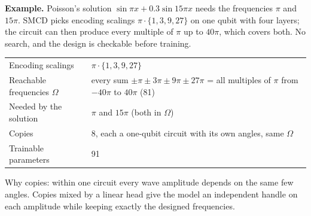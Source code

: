 \documentclass[11pt,a4paper]{article}
\newcommand{\newpart}{\clearpage}
\begin{document}
\textbf{Example.} Poisson's solution $\sin\pi x + 0.3\sin15\pi x$ needs the frequencies
$\pi$ and $15\pi$. SMCD picks encoding scalings $\pi\cdot\{1,3,9,27\}$ on one qubit with
four layers; the circuit can then produce every multiple of $\pi$ up to $40\pi$, which
covers both. No search, and the design is checkable before training.

\begin{center}
\end{center}

\begin{center}
\small
\begin{tabularx}{\linewidth}{@{}l X@{}}
\toprule
Encoding scalings & $\pi\cdot\{1,3,9,27\}$ \\
Reachable frequencies $\Omega$ & every sum $\pm\pi\pm3\pi\pm9\pi\pm27\pi$ = all multiples of $\pi$ from $-40\pi$ to $40\pi$ (81) \\
Needed by the solution & $\pi$ and $15\pi$ \quad (both in $\Omega$) \\
Copies & 8, each a one-qubit circuit with its own angles, same $\Omega$ \\
Trainable parameters & 91 \\
\bottomrule
\end{tabularx}
\end{center}

Why copies: within one circuit every wave amplitude depends on the same few angles.
Copies mixed by a linear head give the model an independent handle on each amplitude
while keeping exactly the designed frequencies.

\newpart
\end{document}
